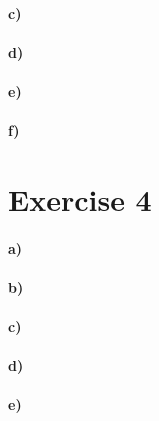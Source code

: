 \documentclass[12pt]{article}
\begin{document}
\paragraph{c)}

\paragraph{d)}

\paragraph{e)}

\paragraph{f)}

\section*{Exercise 4}

\paragraph{a)}

\paragraph{b)}

\paragraph{c)}

\paragraph{d)}

\paragraph{e)}
\end{document}
